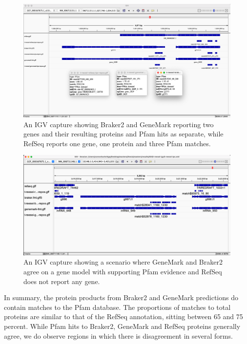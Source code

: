 \begin{figure}[h!]
  \centering
  \includegraphics[width=\textwidth]{figures/igv/ips-model-disagree2.png}
  \caption[Split Pfam matches]{An IGV capture showing Braker2 and
    GeneMark reporting two genes and their resulting proteins and
    Pfam hits as separate, while RefSeq reports one gene, one protein
    and three Pfam matches.}\label{fig:agree-bizarre2}
\end{figure}

\begin{figure}
  \centering
  \includegraphics[width=\textwidth]{figures/igv/ips-braker-genemark-norefseq.png}
  \caption[RefSeq absence with IPS evidence]{An IGV capture showing a
    scenario where GeneMark and Braker2 agree on a gene model with
    supporting Pfam evidence and RefSeq does not report any gene.}\label{fig:ips-no-refseq}
\end{figure}

In summary, the protein products from Braker2 and GeneMark predictions
do contain matches to the Pfam database. The proportions of matches to
total proteins are similar to that of the RefSeq annotation, sitting
between 65 and 75 percent. While Pfam hits to Braker2, GeneMark and
RefSeq proteins generally agree, we do observe regions in which there
is disagreement in several forms.
